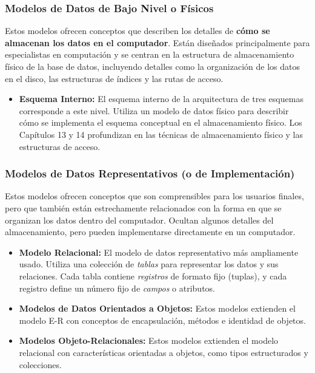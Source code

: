 \subsubsection{Modelos de Datos de Bajo Nivel o Físicos}

Estos modelos ofrecen conceptos que describen los detalles de \textbf{cómo se almacenan los datos en el computador}.  Están diseñados principalmente para especialistas en computación y se centran en la estructura de almacenamiento físico de la base de datos, incluyendo detalles como la organización de los datos en el disco, las estructuras de índices y las rutas de acceso.

\begin{itemize}
    \item \textbf{Esquema Interno:} El esquema interno de la arquitectura de tres esquemas corresponde a este nivel.  Utiliza un modelo de datos físico para describir cómo se implementa el esquema conceptual en el almacenamiento físico. Los Capítulos 13 y 14 profundizan en las técnicas de almacenamiento físico y las estructuras de acceso.
\end{itemize}

\subsubsection{Modelos de Datos Representativos (o de Implementación)}

Estos modelos ofrecen conceptos que son comprensibles para los usuarios finales, pero que también están estrechamente relacionados con la forma en que se organizan los datos dentro del computador.  Ocultan algunos detalles del almacenamiento, pero pueden implementarse directamente en un computador.

\begin{itemize}
    \item \textbf{Modelo Relacional:} El modelo de datos representativo más ampliamente usado.  Utiliza una colección de \textit{tablas} para representar los datos y sus relaciones.  Cada tabla contiene \textit{registros} de formato fijo (tuplas), y cada registro define un número fijo de \textit{campos} o atributos.
    \item \textbf{Modelos de Datos Orientados a Objetos:} Estos modelos extienden el modelo E-R con conceptos de encapsulación, métodos e identidad de objetos.
    \item \textbf{Modelos Objeto-Relacionales:} Estos modelos extienden el modelo relacional con características orientadas a objetos, como tipos estructurados y colecciones.
\end{itemize}

